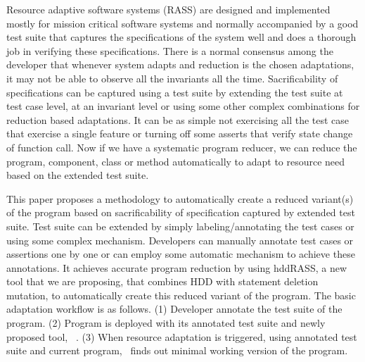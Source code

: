 Resource adaptive software systems (RASS) are designed and implemented mostly for mission critical software systems and normally accompanied by a good test suite that captures the specifications of the system well and does a thorough job in verifying these specifications. There is a normal consensus among the developer that whenever system adapts and reduction is the chosen adaptations, it may not be able to observe all the invariants all the time. Sacrificability of specifications can be captured using a test suite by extending the test suite at test case level, at an invariant level or using some other complex combinations for reduction based adaptations. It can be as simple not exercising all the test case that exercise a single feature or turning off some asserts that verify state change of function call.  Now if we have a systematic program reducer, we can reduce the program, component, class or method automatically to adapt to resource need based on the extended test suite. 

This paper proposes a methodology to automatically create a reduced variant(s) of the program based on sacrificability of specification captured by extended test suite. Test suite can be extended by simply labeling/annotating the test cases or using some complex mechanism. Developers can manually annotate test cases or assertions one by one or can employ some automatic mechanism to achieve these annotations. It achieves accurate program reduction by using hddRASS, a new tool that we are proposing,  that combines HDD with statement deletion mutation, to automatically create this reduced variant of the program. The basic adaptation workflow is as follows. (1) Developer annotate the test suite of the program. (2) Program is deployed with its annotated test suite and newly proposed tool, \mytool\ . (3) When resource adaptation is triggered, using annotated test suite and current program, \mytool\ finds out minimal working version of the program.

